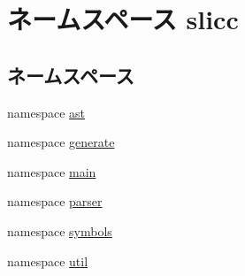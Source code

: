 \hypertarget{namespaceslicc}{
\section{ネームスペース slicc}
\label{namespaceslicc}
}
\subsection*{ネームスペース}
\begin{DoxyCompactItemize}
\item 
namespace \hyperlink{namespaceslicc_1_1ast}{ast}
\item 
namespace \hyperlink{namespaceslicc_1_1generate}{generate}
\item 
namespace \hyperlink{namespaceslicc_1_1main}{main}
\item 
namespace \hyperlink{namespaceslicc_1_1parser}{parser}
\item 
namespace \hyperlink{namespaceslicc_1_1symbols}{symbols}
\item 
namespace \hyperlink{namespaceslicc_1_1util}{util}
\end{DoxyCompactItemize}
